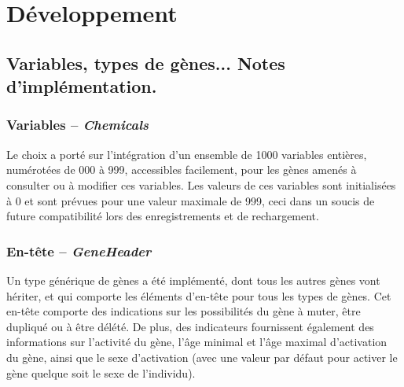 \documentclass[11pt,twoside,a4paper]{article}
\begin{document}
\clearpage

\section{D{\'e}veloppement}



\subsection{Variables, types de g{\`e}nes... Notes d'impl{\'e}mentation. }

\subsubsection{Variables -- \emph{Chemicals}}

Le choix a port{\'e} sur l'int{\'e}gration d'un ensemble de 1000 variables enti{\`e}res, num{\'e}rot{\'e}es de 000 {\`a} 999, accessibles facilement, pour les g{\`e}nes amen{\'e}s {\`a} consulter ou {\`a} modifier ces variables. Les valeurs de ces variables sont initialis{\'e}es {\`a} 0 et sont pr{\'e}vues pour une valeur maximale de 999, ceci dans un soucis de future compatibilit{\'e} lors des enregistrements et de rechargement.

\subsubsection{En-t{\^e}te -- \emph{GeneHeader}}

Un type g{\'e}n{\'e}rique de g{\`e}nes a {\'e}t{\'e} impl{\'e}ment{\'e}, dont tous les autres g{\`e}nes vont h{\'e}riter, et qui comporte les {\'e}l{\'e}ments d'en-t{\^e}te pour tous les types de g{\`e}nes. Cet en-t{\^e}te comporte des indications sur les possibilit{\'e}s du g{\`e}ne {\`a} muter, {\^e}tre dupliqu{\'e} ou {\`a} {\^e}tre d{\'e}l{\'e}t{\'e}. De plus, des indicateurs fournissent {\'e}galement des informations sur l'activit{\'e} du g{\`e}ne, l'{\^a}ge minimal et l'{\^a}ge maximal d'activation du g{\`e}ne, ainsi que le sexe d'activation (avec une valeur par d{\'e}faut pour activer le g{\`e}ne quelque soit le sexe de l'individu).
\end{document}
